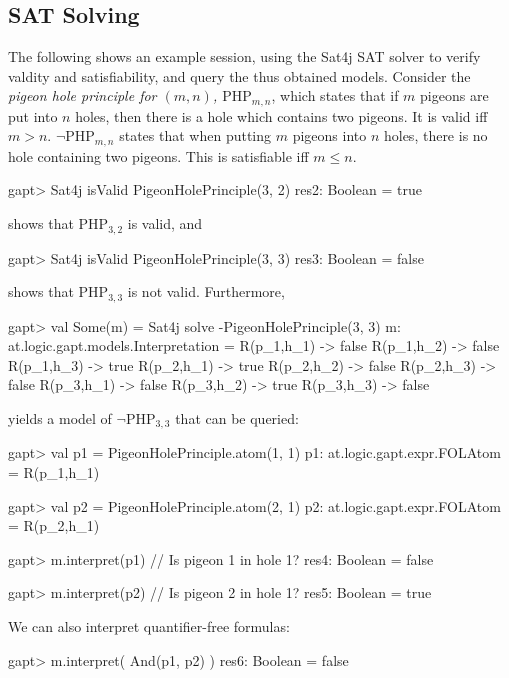 \documentclass[a4paper,11pt]{article}
\begin{document}
\subsection{SAT Solving}
%
The following shows an example session, using the Sat4j SAT solver
to verify valdity and satisfiability, and query the thus obtained models.
Consider the {\em pigeon hole principle for $(m, n)$, $\mathrm{PHP}_{m,n}$}, which states that if $m$ pigeons
are put into $n$ holes, then there is a hole which contains two pigeons. It is valid
iff $m>n$. $\neg\mathrm{PHP}_{m,n}$ states that when putting $m$ pigeons into $n$ holes, there
is no hole containing two pigeons. This is satisfiable iff $m\leq n$.
\begin{clilisting}
gapt> Sat4j isValid PigeonHolePrinciple(3, 2)
res2: Boolean = true

\end{clilisting}
shows that $\mathrm{PHP}_{3,2}$ is valid, and
\begin{clilisting}
gapt> Sat4j isValid PigeonHolePrinciple(3, 3)
res3: Boolean = false

\end{clilisting}
shows that $\mathrm{PHP}_{3,3}$ is not valid.
Furthermore,
\begin{clilisting}
gapt> val Some(m) = Sat4j solve -PigeonHolePrinciple(3, 3)
m: at.logic.gapt.models.Interpretation =
R(p_1,h_1) -> false
R(p_1,h_2) -> false
R(p_1,h_3) -> true
R(p_2,h_1) -> true
R(p_2,h_2) -> false
R(p_2,h_3) -> false
R(p_3,h_1) -> false
R(p_3,h_2) -> true
R(p_3,h_3) -> false

\end{clilisting}
yields a model of $\neg\mathrm{PHP}_{3,3}$ that can be queried:
\begin{clilisting}
gapt> val p1 = PigeonHolePrinciple.atom(1, 1)
p1: at.logic.gapt.expr.FOLAtom = R(p_1,h_1)

gapt> val p2 = PigeonHolePrinciple.atom(2, 1)
p2: at.logic.gapt.expr.FOLAtom = R(p_2,h_1)

gapt> m.interpret(p1) // Is pigeon 1 in hole 1?
res4: Boolean = false

gapt> m.interpret(p2) // Is pigeon 2 in hole 1?
res5: Boolean = true

\end{clilisting}
We can also interpret quantifier-free formulas:
\begin{clilisting}
gapt> m.interpret( And(p1, p2) )
res6: Boolean = false

\end{clilisting}
\end{document}
